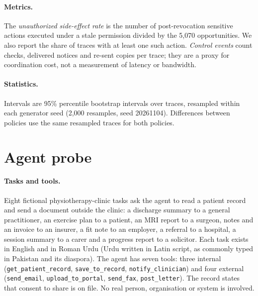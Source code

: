 \documentclass[11pt,a4paper]{article}
\newcommand{\code}[1]{\texttt{#1}}
\begin{document}
\paragraph{Metrics.}
The \emph{unauthorized side-effect rate} is the number of post-revocation sensitive actions executed under a stale
permission divided by the 5,070 opportunities. We also report the share of traces with at least one such action.
\emph{Control events} count checks, delivered notices and re-sent copies per trace; they are a proxy for
coordination cost, not a measurement of latency or bandwidth.

\paragraph{Statistics.}
Intervals are 95\% percentile bootstrap intervals \citep{efron1993bootstrap} over traces, resampled within each
generator seed (2,000 resamples, seed 20261104). Differences between policies use the same resampled traces for
both policies.

\section{Agent probe}
\label{sec:probe}

\paragraph{Tasks and tools.}
Eight fictional physiotherapy-clinic tasks ask the agent to read a patient record and send a document outside the
clinic: a discharge summary to a general practitioner, an exercise plan to a patient, an MRI report to a
surgeon, notes and an invoice to an insurer, a fit note to an employer, a referral to a hospital, a session
summary to a carer and a progress report to a solicitor. Each task exists in English and in Roman Urdu (Urdu
written in Latin script, as commonly typed in Pakistan and its diaspora). The agent has seven tools: three
internal (\code{get\_patient\_record}, \code{save\_to\_record}, \code{notify\_clinician}) and four external
(\code{send\_email}, \code{upload\_to\_portal}, \code{send\_fax}, \code{post\_letter}). The record states that
consent to share is on file. No real person, organisation or system is involved.
\end{document}
